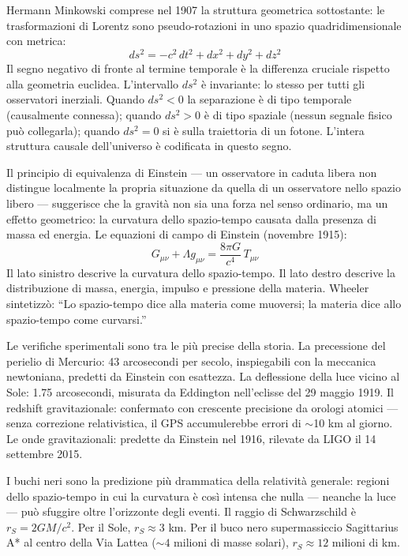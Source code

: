 \documentclass[12pt,a4paper,openany]{book}
\newcommand{\sezione}[1]{\vspace{1.2em}{\large\bfseries #1}\vspace{0.5em}\par}
\begin{document}
Hermann Minkowski comprese nel 1907 la struttura geometrica sottostante: le trasformazioni di Lorentz sono pseudo-rotazioni in uno spazio quadridimensionale con metrica:
\[
ds^2 = -c^2\,dt^2 + dx^2 + dy^2 + dz^2
\]
Il segno negativo di fronte al termine temporale è la differenza cruciale rispetto alla geometria euclidea. L'intervallo $ds^2$ è invariante: lo stesso per tutti gli osservatori inerziali. Quando $ds^2 < 0$ la separazione è di tipo temporale (causalmente connessa); quando $ds^2 > 0$ è di tipo spaziale (nessun segnale fisico può collegarla); quando $ds^2 = 0$ si è sulla traiettoria di un fotone. L'intera struttura causale dell'universo è codificata in questo segno.

\sezione{La relatività generale: la gravità come curvatura}

Il principio di equivalenza di Einstein — un osservatore in caduta libera non distingue localmente la propria situazione da quella di un osservatore nello spazio libero — suggerisce che la gravità non sia una forza nel senso ordinario, ma un effetto geometrico: la curvatura dello spazio-tempo causata dalla presenza di massa ed energia. Le equazioni di campo di Einstein (novembre 1915):
\[
G_{\mu\nu} + \Lambda g_{\mu\nu} = \frac{8\pi G}{c^4}\,T_{\mu\nu}
\]
Il lato sinistro descrive la curvatura dello spazio-tempo. Il lato destro descrive la distribuzione di massa, energia, impulso e pressione della materia. Wheeler sintetizzò: ``Lo spazio-tempo dice alla materia come muoversi; la materia dice allo spazio-tempo come curvarsi.''

Le verifiche sperimentali sono tra le più precise della storia. La precessione del perielio di Mercurio: 43 arcosecondi per secolo, inspiegabili con la meccanica newtoniana, predetti da Einstein con esattezza. La deflessione della luce vicino al Sole: 1.75 arcosecondi, misurata da Eddington nell'eclisse del 29 maggio 1919. Il redshift gravitazionale: confermato con crescente precisione da orologi atomici --- senza correzione relativistica, il GPS accumulerebbe errori di $\sim$10 km al giorno. Le onde gravitazionali: predette da Einstein nel 1916, rilevate da LIGO il 14 settembre 2015.

\sezione{I buchi neri come laboratori della fisica estrema}

I buchi neri sono la predizione più drammatica della relatività generale: regioni dello spazio-tempo in cui la curvatura è così intensa che nulla --- neanche la luce --- può sfuggire oltre l'orizzonte degli eventi. Il raggio di Schwarzschild è $r_S = 2GM/c^2$. Per il Sole, $r_S \approx 3$ km. Per il buco nero supermassiccio Sagittarius A* al centro della Via Lattea ($\sim 4$ milioni di masse solari), $r_S \approx 12$ milioni di km.
\end{document}
